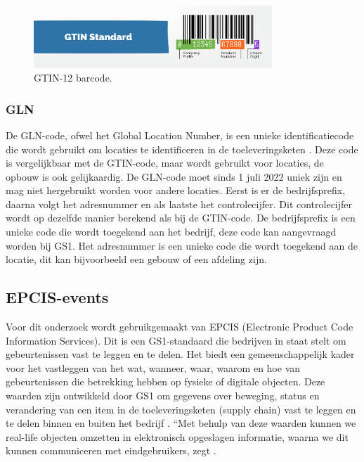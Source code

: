 \begin{figure}[H]
     \centering
     \includegraphics[width=0.8\textwidth]{./img/barcode_gtin12.jpg}
     \caption[GTIN-12 barcode]{\label{fig:barcorde} GTIN-12 barcode. }
\end{figure}

\subsubsection{GLN}
De GLN-code, ofwel het Global Location Number, is een unieke identificatiecode die wordt gebruikt om locaties te identificeren in de toeleveringsketen \autocite{GLN}.
Deze code is vergelijkbaar met de GTIN-code, maar wordt gebruikt voor locaties, de opbouw is ook gelijkaardig.
De GLN-code moet sinds 1 juli 2022 uniek zijn en mag niet hergebruikt worden voor andere locaties.
Eerst is er de bedrijfsprefix, daarna volgt het adresnummer en als laatste het controlecijfer.
Dit controlecijfer wordt op dezelfde manier berekend als bij de GTIN-code.
De bedrijfsprefix is een unieke code die wordt toegekend aan het bedrijf, deze code kan aangevraagd worden bij GS1. Het adresnummer is een unieke code die wordt toegekend aan de locatie, dit kan bijvoorbeeld een gebouw of een afdeling zijn.

\subsection{EPCIS-events}
Voor dit onderzoek wordt gebruikgemaakt van EPCIS (Electronic Product Code Information Services). Dit is een GS1-standaard die bedrijven in staat stelt om gebeurtenissen vast te leggen en te delen. 
Het biedt een gemeenschappelijk kader voor het vastleggen van het wat, wanneer, waar, waarom en hoe van gebeurtenissen die betrekking hebben op fysieke of digitale objecten. 
Deze waarden zijn ontwikkeld door GS1 om gegevens over beweging, status en verandering van een item in de toeleveringsketen (supply chain) vast te leggen en te delen binnen en buiten het bedrijf \autocite{Devins}.
``Met behulp van deze waarden kunnen we real-life objecten omzetten in elektronisch opgeslagen informatie, waarna we dit kunnen communiceren met eindgebruikers, zegt \textcite{Devins}.

